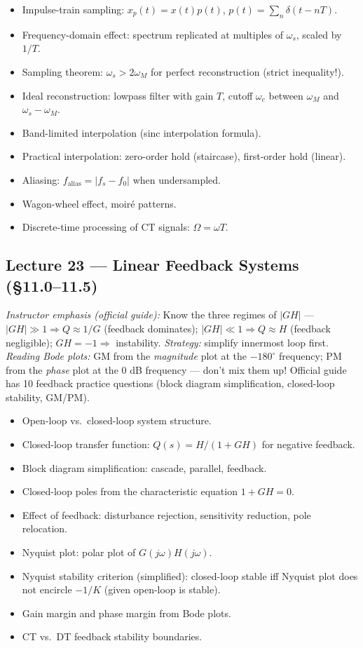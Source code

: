 \documentclass{article}
\begin{document}
\begin{itemize}
  \item Impulse-train sampling: $x_p(t) = x(t) p(t)$, $p(t) = \sum_n \delta(t-nT)$.
  \item Frequency-domain effect: spectrum replicated at multiples of $\omega_s$, scaled by $1/T$.
  \item Sampling theorem: $\omega_s > 2\omega_M$ for perfect reconstruction (strict inequality!).
  \item Ideal reconstruction: lowpass filter with gain $T$, cutoff $\omega_c$ between $\omega_M$ and $\omega_s-\omega_M$.
  \item Band-limited interpolation (sinc interpolation formula).
  \item Practical interpolation: zero-order hold (staircase), first-order hold (linear).
  \item Aliasing: $f_\text{alias} = |f_s - f_0|$ when undersampled.
  \item Wagon-wheel effect, moir\'e patterns.
  \item Discrete-time processing of CT signals: $\Omega = \omega T$.
\end{itemize}

\subsection*{Lecture 23 --- Linear Feedback Systems (\S11.0--11.5)}

\noindent\emph{Instructor emphasis (official guide):} Know the three regimes of $|GH|$ --- $|GH|\gg 1 \Rightarrow Q\approx 1/G$ (feedback dominates); $|GH|\ll 1 \Rightarrow Q\approx H$ (feedback negligible); $GH=-1 \Rightarrow$ instability. \emph{Strategy:} simplify innermost loop first. \emph{Reading Bode plots:} GM from the \emph{magnitude} plot at the $-180^\circ$ frequency; PM from the \emph{phase} plot at the 0 dB frequency --- don't mix them up! Official guide has 10 feedback practice questions (block diagram simplification, closed-loop stability, GM/PM).

\begin{itemize}
  \item Open-loop vs.\ closed-loop system structure.
  \item Closed-loop transfer function: $Q(s) = H/(1+GH)$ for negative feedback.
  \item Block diagram simplification: cascade, parallel, feedback.
  \item Closed-loop poles from the characteristic equation $1 + GH = 0$.
  \item Effect of feedback: disturbance rejection, sensitivity reduction, pole relocation.
  \item Nyquist plot: polar plot of $G(j\omega)H(j\omega)$.
  \item Nyquist stability criterion (simplified): closed-loop stable iff Nyquist plot does not encircle $-1/K$ (given open-loop is stable).
  \item Gain margin and phase margin from Bode plots.
  \item CT vs.\ DT feedback stability boundaries.
\end{itemize}
\end{document}
